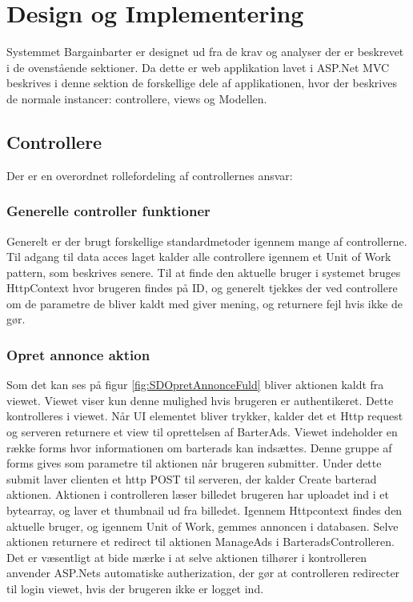 \chapter{Design og Implementering}
Systemmet Bargainbarter er designet ud fra de krav og analyser der er beskrevet i de ovenstående sektioner. Da dette er web applikation lavet i ASP.Net MVC beskrives i denne sektion de forskellige dele af applikationen, hvor der beskrives de normale instancer: controllere, views og Modellen. 


\section{Controllere}
Der er en overordnet rollefordeling af controllernes ansvar: 



\subsection{Generelle controller funktioner}

Generelt er der brugt forskellige standardmetoder igennem mange af controllerne. Til adgang til data acces laget kalder alle controllere igennem et Unit of Work pattern, som beskrives senere. Til at finde den aktuelle bruger i systemet bruges HttpContext hvor brugeren findes på ID, og generelt tjekkes der ved controllere om de parametre de bliver kaldt med giver mening, og returnere fejl hvis ikke de gør.  

\subsection{Opret annonce aktion}

Som det kan ses på figur \ref{fig:SDOpretAnnonceFuld} bliver aktionen kaldt fra viewet. Viewet viser kun denne mulighed hvis brugeren er authentikeret. Dette kontrolleres i viewet. Når UI elementet bliver trykker, kalder det et Http request og serveren returnere et view til oprettelsen af BarterAds.
Viewet indeholder en række forms hvor informationen om barterads kan indsættes. Denne gruppe af forms gives som parametre til aktionen når brugeren submitter. Under dette submit laver clienten et http POST til serveren, der kalder Create barterad aktionen. Aktionen i controlleren læser billedet brugeren har uploadet ind i et bytearray, og laver et thumbnail ud fra billedet. Igennem Httpcontext findes den aktuelle bruger, og igennem Unit of Work, gemmes annoncen i databasen. Selve aktionen returnere et redirect til aktionen ManageAds i BarteradsControlleren. Det er væsentligt at bide mærke i at selve aktionen tilhører i kontrolleren anvender ASP.Nets automatiske autherization, der gør at controlleren redirecter til login viewet, hvis der brugeren ikke er logget ind.


